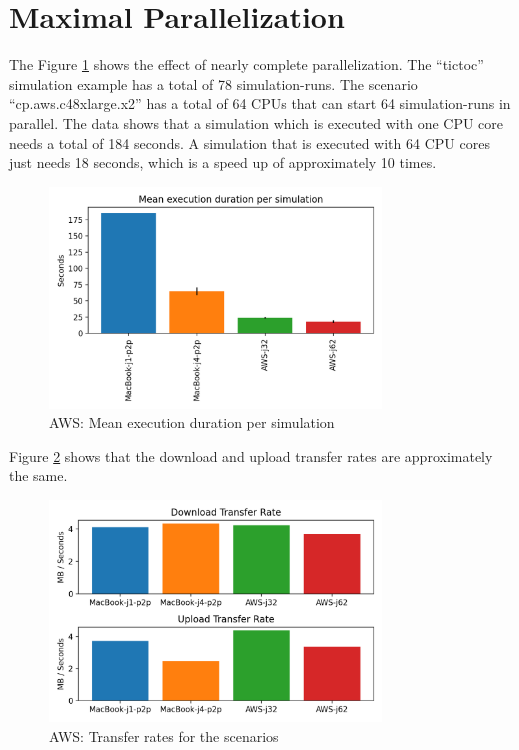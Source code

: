 \section{Maximal Parallelization}

The Figure \ref{fig:eval-aws-duration} shows the effect of nearly complete parallelization. The “tictoc” simulation example has a total of 78 simulation-runs. The scenario “cp.aws.c48xlarge.x2” has a total of 64 CPUs that can start 64 simulation-runs in parallel. The data shows that a simulation which is executed with one CPU core needs a total of 184 seconds. A simulation that is executed with 64 CPU cores just needs 18 seconds, which is a speed up of approximately 10 times.

\begin{figure}[h]
  \centering
  \includegraphics[width=250pt]{images/eval/aws/Mean execution duration per simulation}
  \caption{AWS: Mean execution duration per simulation}
  \label{fig:eval-aws-duration}
\end{figure}

Figure \ref{fig:eval-aws-transfer} shows that the download and upload transfer rates are approximately the same.

\begin{figure}[h]
  \centering
  \includegraphics[width=250pt]{images/eval/aws/Transfer Rate}
  \caption{AWS: Transfer rates for the scenarios}
  \label{fig:eval-aws-transfer}
\end{figure}
